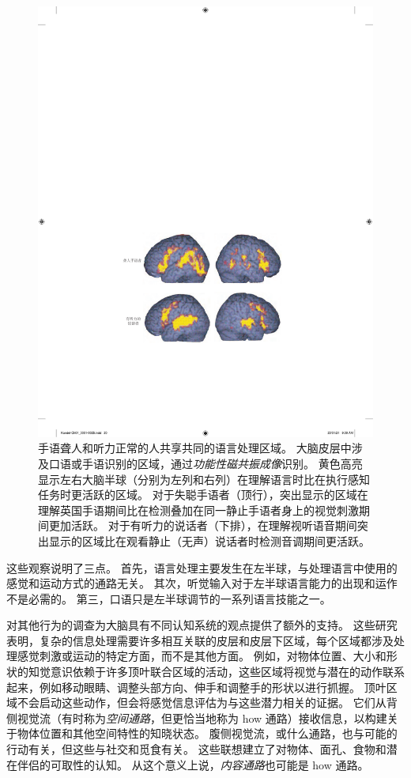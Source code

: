 \begin{figure}[htbp]
	\centering
	\includegraphics[width=0.75\linewidth]{chap01/fig_1_8}
	\caption{手语聋人和听力正常的人共享共同的语言处理区域。
		大脑皮层中涉及口语或手语识别的区域，通过\textit{功能性磁共振成像}识别。
		黄色高亮显示左右大脑半球（分别为左列和右列）在理解语言时比在执行感知任务时更活跃的区域。
		对于失聪手语者（顶行），突出显示的区域在理解英国手语期间比在检测叠加在同一静止手语者身上的视觉刺激期间更加活跃。
		对于有听力的说话者（下排），在理解视听语音期间突出显示的区域比在观看静止（无声）说话者时检测音调期间更活跃\cite{macsweeney2002neural}。}
	\label{fig:1_8}
\end{figure}


这些观察说明了三点。
首先，语言处理主要发生在左半球，与处理语言中使用的感觉和运动方式的通路无关。
其次，听觉输入对于左半球语言能力的出现和运作不是必需的。
第三，口语只是左半球调节的一系列语言技能之一。


对其他行为的调查为大脑具有不同认知系统的观点提供了额外的支持。
这些研究表明，复杂的信息处理需要许多相互关联的皮层和皮层下区域，每个区域都涉及处理感觉刺激或运动的特定方面，而不是其他方面。
例如，对物体位置、大小和形状的知觉意识依赖于许多顶叶联合区域的活动，这些区域将视觉与潜在的动作联系起来，例如移动眼睛、调整头部方向、伸手和调整手的形状以进行抓握。
顶叶区域不会启动这些动作，但会将感觉信息评估为与这些潜力相关的证据。
它们从背侧视觉流（有时称为\textit{空间通路}，但更恰当地称为 how 通路）接收信息，以构建关于物体位置和其他空间特性的知晓状态。
腹侧视觉流，或什么通路，也与可能的行动有关，但这些与社交和觅食有关。
这些联想建立了对物体、面孔、食物和潜在伴侣的可取性的认知。
从这个意义上说，\textit{内容通路}也可能是 how 通路。



